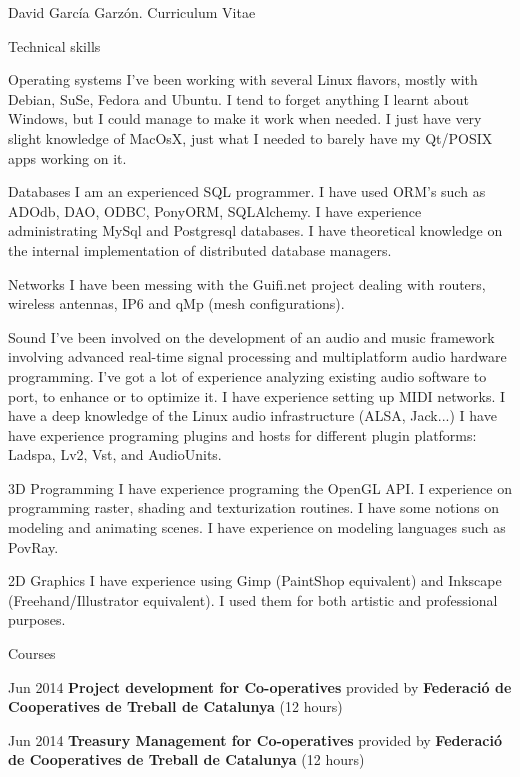 \documentclass{article}
\begin{document}
\begin{cv}{David García Garzón. Curriculum Vitae}
\begin{cvlist}{Technical skills}
\item[Operating systems]
	I've been working with several Linux flavors, mostly with Debian, SuSe, Fedora and Ubuntu. I tend to forget anything I learnt about Windows, but I could manage to make it work when needed. I just have very slight knowledge of MacOsX, just what I needed to barely have my Qt/POSIX apps working on it.

\item[Databases]
	I am an experienced SQL programmer. I have used ORM's such as ADOdb, DAO, ODBC, PonyORM, SQLAlchemy. I have experience administrating MySql and Postgresql databases. I have theoretical knowledge on the internal implementation of distributed database managers. 

\item[Networks]
	I have been messing with the Guifi.net project dealing with routers, wireless antennas, IP6 and qMp (mesh configurations). 

\item[Sound]
	I've been involved on the development of an audio and music framework involving advanced real-time signal processing and multiplatform audio hardware programming. I've got a lot of experience analyzing existing audio software to port, to enhance or to optimize it. I have experience setting up MIDI networks. I have a deep knowledge of the Linux audio infrastructure (ALSA, Jack...) I have have experience programing plugins and hosts for different plugin platforms: Ladspa, Lv2, Vst, and AudioUnits. 

\item[3D Programming]
	I have experience programing the OpenGL API. I experience on programming raster, shading and texturization routines. I have some notions on modeling and animating scenes. I have experience on modeling languages such as PovRay. 

\item[2D Graphics]
	I have experience using Gimp (PaintShop equivalent) and Inkscape (Freehand/Illustrator equivalent). I used them for both artistic and professional purposes. 

\end{cvlist}

\begin{cvlist}{Courses}

\item[Jun 2014]
	{\bf Project development for Co-operatives } provided by {\bf Federació de Cooperatives de Treball de Catalunya} (12 hours)

\item[Jun 2014]
	{\bf Treasury Management for Co-operatives } provided by {\bf Federació de Cooperatives de Treball de Catalunya} (12 hours)


\end{cvlist}
\end{cv}
\end{document}
